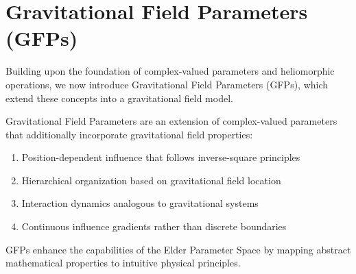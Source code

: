 \section{Gravitational Field Parameters (GFPs)}

Building upon the foundation of complex-valued parameters and heliomorphic operations, we now introduce Gravitational Field Parameters (GFPs), which extend these concepts into a gravitational field model.

\begin{definition}
Gravitational Field Parameters are an extension of complex-valued parameters that additionally incorporate gravitational field properties:
\begin{enumerate}
    \item Position-dependent influence that follows inverse-square principles
    \item Hierarchical organization based on gravitational field location
    \item Interaction dynamics analogous to gravitational systems
    \item Continuous influence gradients rather than discrete boundaries
\end{enumerate}
\end{definition}

GFPs enhance the capabilities of the Elder Parameter Space by mapping abstract mathematical properties to intuitive physical principles.

